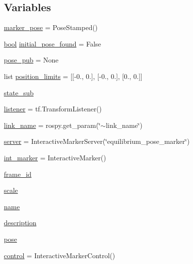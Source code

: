 \subsection*{Variables}
\begin{DoxyCompactItemize}
\item 
\hyperlink{namespaceinteractive__marker_ab05cd11b66bc37f2aee6ea4ee9d9899a}{marker\+\_\+pose} = Pose\+Stamped()
\item 
\hyperlink{classbool}{bool} \hyperlink{namespaceinteractive__marker_af538086dc1c352610f3169b49839a050}{initial\+\_\+pose\+\_\+found} = False
\item 
\hyperlink{namespaceinteractive__marker_a8e8c3785e42901a7610214ff727338ac}{pose\+\_\+pub} = None
\item 
list \hyperlink{namespaceinteractive__marker_aae45ba5b707ff3b4546ae4bbb9b49b39}{position\+\_\+limits} = \mbox{[}\mbox{[}-\/0., 0.\mbox{]}, \mbox{[}-\/0., 0.\mbox{]}, \mbox{[}0., 0.\mbox{]}\mbox{]}
\item 
\hyperlink{namespaceinteractive__marker_a260de5ba27646b7e6840abc1819deea8}{state\+\_\+sub}
\item 
\hyperlink{namespaceinteractive__marker_a0e579ab555212bb5e2c9f8a675b7618a}{listener} = tf.\+Transform\+Listener()
\item 
\hyperlink{namespaceinteractive__marker_ad4be871390c9720f44a629c719c96923}{link\+\_\+name} = rospy.\+get\+\_\+param(\char`\"{}$\sim$link\+\_\+name\char`\"{})
\item 
\hyperlink{namespaceinteractive__marker_a0913a920340099e56f9b000d508380eb}{server} = Interactive\+Marker\+Server(\char`\"{}equilibrium\+\_\+pose\+\_\+marker\char`\"{})
\item 
\hyperlink{namespaceinteractive__marker_ae29f4fcac0d5d63e0fe4542ec4b3fc65}{int\+\_\+marker} = Interactive\+Marker()
\item 
\hyperlink{namespaceinteractive__marker_ac2bed062650fc4b024b550a1176d9913}{frame\+\_\+id}
\item 
\hyperlink{namespaceinteractive__marker_ae2c7b9865bba9817db3359dba96e4507}{scale}
\item 
\hyperlink{namespaceinteractive__marker_a447655961b3d3ca3c5a2a9d3d769436d}{name}
\item 
\hyperlink{namespaceinteractive__marker_a8d5149395ebebadc404797fba74b4fbf}{description}
\item 
\hyperlink{namespaceinteractive__marker_a06e4691dc5f93e0da6dc9a6efa8d99b5}{pose}
\item 
\hyperlink{namespaceinteractive__marker_a8fd433e78cfd74cc72adf0682a6138ee}{control} = Interactive\+Marker\+Control()

\end{DoxyCompactItemize}
